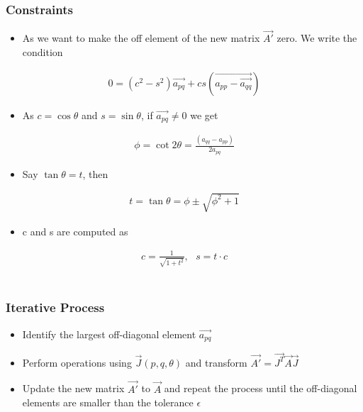\documentclass[journal]{IEEEtran}
\begin{document}
\subsubsection{Constraints}
\begin{itemize}
    \item As we want to make the off element of the new matrix $\vec{A'}$ zero. We write the condition 
\end{itemize}
\begin{align*}
    0=(c^2-s^2)\vec{a_{pq}}+c s(\vec{a_{pp}-\vec{a_{qq}}})
\end{align*}
\begin{itemize}
    \item As $c=\cos\theta$ and $s=\sin\theta$, if $\vec{a_{pq}}\neq 0$ we get 
\end{itemize}
\begin{align*}
    \phi = \cot2\theta = \frac{(a_{qq}-a_{pp})}{2a_{pq}}
\end{align*}
\begin{itemize}
    \item Say $\tan\theta=t$, then
\end{itemize}
\begin{align*}
    t=\tan\theta= \phi \pm \sqrt{\phi^2+1}
\end{align*}
\begin{itemize}
    \item c and s are computed as 
\end{itemize}
\begin{align*}
    c=\frac{1}{\sqrt{1+t^2}}, \text{ } s=t\cdot c 
\end{align*}\\
\subsubsection{Iterative Process}
\begin{itemize}
    \item Identify the largest off-diagonal element $\vec{a_{pq}}$
    \item Perform operations using $\vec{J}(p,q,\theta)$ and transform $\vec{A'}=\vec{J^T}\vec{A}\vec{J}$
    \item Update the new matrix $\vec{A'}$ to $\vec{A}$ and repeat the process until the off-diagonal elements are smaller than the tolerance $\epsilon$ \\
\end{itemize}
\end{document}
